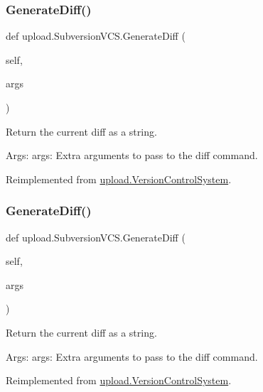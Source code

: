 \subsubsection{\texorpdfstring{GenerateDiff()}{GenerateDiff()}\hspace{0.1cm}{\footnotesize\ttfamily [1/2]}}
{\footnotesize\ttfamily def upload.\+Subversion\+V\+C\+S.\+Generate\+Diff (\begin{DoxyParamCaption}\item[{}]{self,  }\item[{}]{args }\end{DoxyParamCaption})}

\begin{DoxyVerb}Return the current diff as a string.

Args:
  args: Extra arguments to pass to the diff command.
\end{DoxyVerb}
 

Reimplemented from \mbox{\hyperlink{classupload_1_1_version_control_system_aa5eb260c96e7016dab36b5fc136c9f49}{upload.\+Version\+Control\+System}}.

\mbox{\label{classupload_1_1_subversion_v_c_s_a07c2d341f2c7df2772dd7f85e89b0212}} 
\subsubsection{\texorpdfstring{GenerateDiff()}{GenerateDiff()}\hspace{0.1cm}{\footnotesize\ttfamily [2/2]}}
{\footnotesize\ttfamily def upload.\+Subversion\+V\+C\+S.\+Generate\+Diff (\begin{DoxyParamCaption}\item[{}]{self,  }\item[{}]{args }\end{DoxyParamCaption})}

\begin{DoxyVerb}Return the current diff as a string.

Args:
  args: Extra arguments to pass to the diff command.
\end{DoxyVerb}
 

Reimplemented from \mbox{\hyperlink{classupload_1_1_version_control_system_aa5eb260c96e7016dab36b5fc136c9f49}{upload.\+Version\+Control\+System}}.

